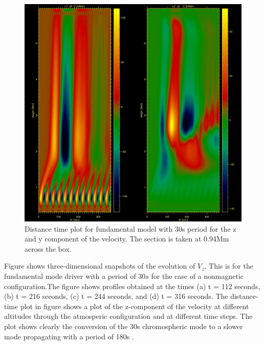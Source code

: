 \documentclass{aa}
\begin{document}
\begin{figure}[h]\label{fig30dt_mode0}
\includegraphics[scale=0.5]{images/pm30s_sindrv_n0_4b03d_dt.jpg}
\caption{Distance time plot for fundamental model with 30s period for the z and y component of the velocity. The section  is taken at 0.94Mm across the box. }
\end{figure}



Figure  shows three-dimensional snapshots of the evolution of $V_{z}$. This is for the fundamental mode driver with a period of $30s$ for the case of a nonmagnetic configuration.The figure shows profiles obtained at the times (a) t = 112 seconds, (b) t = 216 seconds, (c) t = 244 seconds, and (d) t = 316 seconds. The distance-time plot in figure  shows a plot of the z-component of the velocity at different altitudes through the atmosperic configuration and at different time steps. The plot shows clearly the conversion of the 30s chromospheric mode to a slower mode propagating with a period of 180s \cite{Leibacher1982}. 








\end{document}
